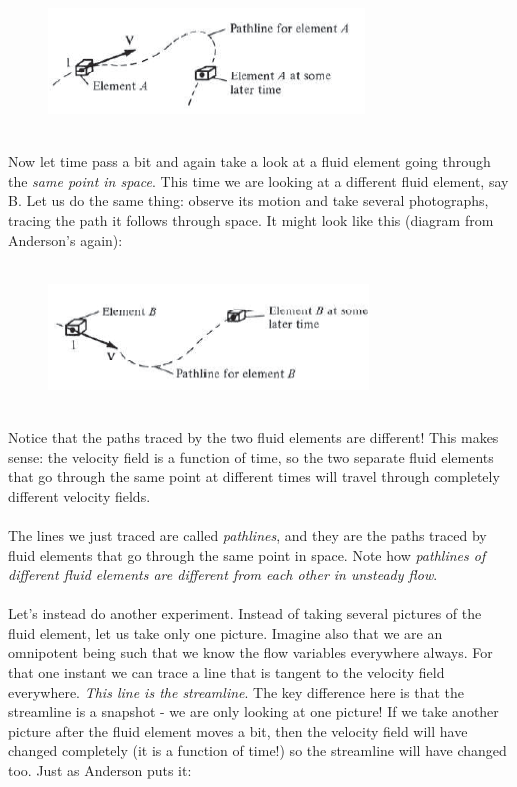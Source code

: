 \documentclass[11pt]{article}
\begin{document}
\begin{figure}[h]
    \includegraphics{elementApathline.png}
    \centering
\end{figure}
\noindent
\\Now let time pass a bit and again take a look at a fluid element going through the \emph{same point in space}. This time we are looking at a different fluid element, say B. Let us do the same thing: observe its motion and take several photographs, tracing the path it follows through space. It might look like this (diagram from Anderson's again): \\ \\

\begin{figure}[h]
    \includegraphics{elementBpathline.png}
    \centering
\end{figure}
\noindent
\\Notice that the paths traced by the two fluid elements are different! This makes sense: the velocity field is a function of time, so the two separate fluid elements that go through the same point at different times will travel through completely different velocity fields. \\ \\
\noindent
The lines we just traced are called \emph{pathlines}, and they are the paths traced by fluid elements that go through the same point in space. Note how \emph{pathlines of different fluid elements are different from each other in unsteady flow}.\\ \\
\noindent
Let's instead do another experiment. Instead of taking several pictures of the fluid element, let us take only one picture. Imagine also that we are an omnipotent being such that we know the flow variables everywhere always. For that one instant we can trace a line that is tangent to the velocity field everywhere. \emph{This line is the streamline}. The key difference here is that the streamline is a snapshot - we are only looking at one picture! If we take another picture after the fluid element moves a bit, then the velocity field will have changed completely (it is a function of time!) so the streamline will have changed too. Just as Anderson puts it:
\end{document}
